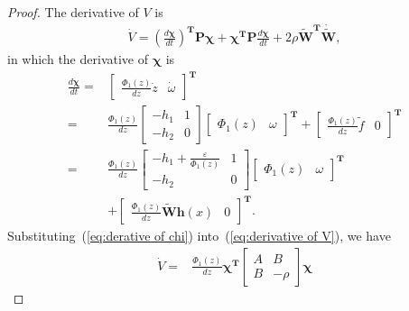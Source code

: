 \documentclass{ifacconf}
\begin{document}
\begin{proof}
The derivative of $V$ is
 \begin{align}
\dot{V}=\left(\frac{d \bm{\chi}}{dt}\right)^{\bm T} \bm{P \chi}+\bm{\chi^T P}\frac{d \bm{\chi}}{dt}+2\rho \bm{\tilde{W}}^{\bm{T}}\dot{\bm{\tilde{W}}},
    \label{eq:derivative of V}
 \end{align}
in which the derivative of $\bm{\chi}$ is 
\begin{align}
\frac{d \bm{\chi}}{dt}=&
\left[
\begin{array}{cc}
  \frac{\Phi_1(z)}{dz}\dot{z} & \dot{\omega}
\end{array}
\right]^{\bm{T}} 
\nonumber \\
=&
\frac{\Phi_1(z)}{dz}
\left[
\begin{array}{cc}
-h_1 & 1\\
-h_2 & 0
\end{array}
\right]\left[
  \begin{array}{cc}
    \Phi_1(z) &
    \omega
  \end{array}
\right]^{\bm{T}}+
\left[
\begin{array}{cc}
   \frac{\Phi_1(z)}{dz}\tilde{f}  &  0
\end{array}
\right]^{\bm{T}}
\nonumber \\
=&
\frac{\Phi_1(z)}{dz}
\left[
\begin{array}{cc}
-h_1+\frac{\varepsilon}{\Phi_1(z)} & 1\\
-h_2 & 0
\end{array}
\right]\left[
  \begin{array}{cc}
    \Phi_1(z) &
    \omega
  \end{array}
\right]^{\bm{T}}
\nonumber \\
~&+
\left[
\begin{array}{cc}
   \frac{\Phi_1(z)}{dz}\bm{\tilde{W}}\bm{h}(x)  &  0
\end{array}
\right]^{\bm{T}}
. \label{eq:derative of chi}
\end{align} 
Substituting~(\ref{eq:derative of chi}) into~(\ref{eq:derivative of V}), we have
\begin{align} 
\dot{V}=&\frac{\Phi_1(z)}{dz} 
\bm{\chi}^{\bm{T}}
\left[
\begin{array}{cc}
     A & B \\
     B & -\rho 
\end{array}
\right]{\bm{\chi}}

\end{align}
\end{proof}
\end{document}
